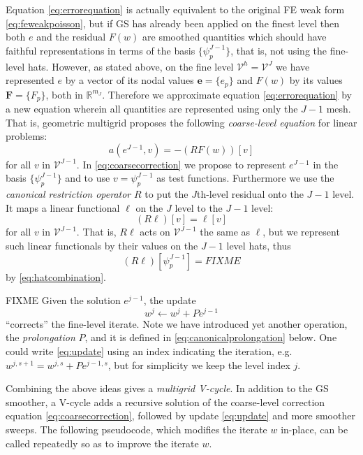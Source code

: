 \documentclass[letterpaper,final,12pt,reqno]{amsart}
\theoremstyle{claim}
\newcommand{\RR}{\mathbb{R}}
\newcommand{\be}{\mathbf{e}}
\newcommand{\bF}{\mathbf{F}}
\numberwithin{equation}{section}
\numberwithin{figure}{section}
\numberwithin{table}{section}
\begin{document}
Equation \eqref{eq:errorequation} is actually equivalent to the original FE weak form \eqref{eq:feweakpoisson}, but if GS has already been applied on the finest level then both $e$ and the residual $F(w)$ are smoothed quantities which should have faithful representations in terms of the basis $\{\psi_p^{J-1}\}$, that is, not using the fine-level hats.  However, as stated above, on the fine level $\mathcal{V}^h=\mathcal{V}^J$ we have represented $e$ by a vector of its nodal values $\be = \{e_p\}$ and $F(w)$ by its values $\bF=\{F_p\}$, both in $\RR^{m_J}$.  Therefore we approximate equation \eqref{eq:errorequation} by a new equation wherein all quantities are represented using only the $J-1$ mesh.  That is, geometric multigrid proposes the following \emph{coarse-level equation} for linear problems:
\begin{equation}
  a(e^{J-1},v) = - (RF(w))[v]  \label{eq:coarsecorrection}
\end{equation}
for all $v$ in $\mathcal{V}^{J-1}$.  In \eqref{eq:coarsecorrection} we propose to represent $e^{J-1}$ in the basis $\{\psi_p^{J-1}\}$ and to use $v=\psi_p^{J-1}$ as test functions.  Furthermore we use the \emph{canonical restriction operator} $R$ to put the $J$th-level residual onto the $J-1$ level.  It maps a linear functional $\ell$ on the $J$ level to the $J-1$ level:
\begin{equation}
  (R \ell)[v] = \ell[v] \label{eq:canonicalrestriction}
\end{equation}
for all $v$ in $\mathcal{V}^{J-1}$.  That is, $R \ell$ acts on $\mathcal{V}^{J-1}$ the same as $\ell$, but we represent such linear functionals by their values on the $J-1$ level hats, thus
\begin{equation}
  (R \ell)[\psi_p^{J-1}] = FIXME
\end{equation}
by \eqref{eq:hatcombination}.

FIXME  Given the solution $e^{j-1}$, the update
\begin{equation}
  w^j \gets w^j + P e^{j-1}  \label{eq:update}
\end{equation}
``corrects'' the fine-level iterate.  Note we have introduced yet another operation, the \emph{prolongation} $P$, and it is defined in \eqref{eq:canonicalprolongation} below.  One could write \eqref{eq:update} using an index indicating the iteration, e.g.~$w^{j,s+1} = w^{j,s} + Pe^{j-1,s}$, but for simplicity we keep the level index $j$.

Combining the above ideas gives a \emph{multigrid V-cycle}.  In addition to the GS smoother, a V-cycle adds a recursive solution of the coarse-level correction equation \eqref{eq:coarsecorrection}, followed by update \eqref{eq:update} and more smoother sweeps.  The following pseudocode, which modifies the iterate $w$ in-place, can be called repeatedly so as to improve the iterate $w$.
\end{document}
